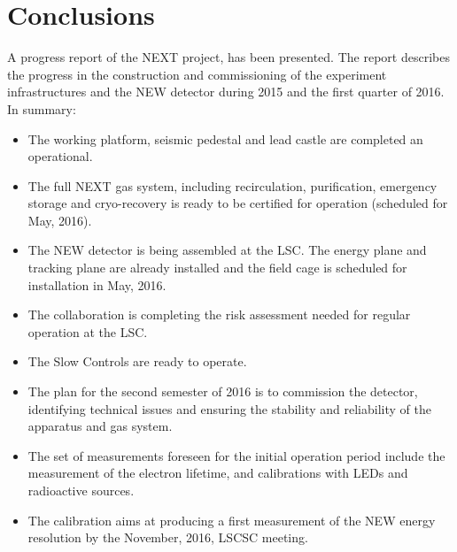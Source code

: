 \section{Conclusions}
\label{sec.conclu}

A progress report of the NEXT project, has been presented. The report describes the progress in the construction and commissioning of the experiment infrastructures and the NEW detector during 2015 and the first quarter of 2016. In summary:

\begin{itemize}
\item The working platform, seismic pedestal and lead castle are completed an operational.
\item The full NEXT gas system, including recirculation, purification, emergency storage and cryo-recovery is ready to be certified for operation (scheduled for May, 2016).
\item The NEW detector is being assembled at the LSC. The energy plane and tracking plane are already installed and the field cage is scheduled for installation in May, 2016.
\item The collaboration is completing the risk assessment needed for regular operation at the LSC. 
\item The Slow Controls are ready to operate. 
\item The plan for the second semester of 2016 is to commission the detector, identifying technical issues and ensuring the stability and reliability of the apparatus and gas system. 
\item The set of measurements foreseen for the initial operation period include the measurement of the electron lifetime, and calibrations with LEDs and radioactive sources. 
\item The calibration aims at producing a first measurement of the NEW energy resolution by the November, 2016, LSCSC meeting. 
\end{itemize}

